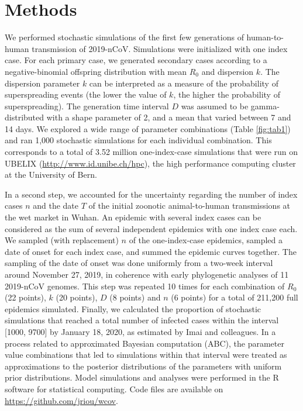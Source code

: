 \documentclass{article}
\begin{document}
\section{Methods}
We performed stochastic simulations of the first few generations of human-to-human transmission of 2019-nCoV. 
Simulations were initialized with one index case.
For each primary case, we generated secondary cases according to a negative-binomial offspring distribution with mean $R_0$ and dispersion $k$.\citep{Lloyd-Smith:2005,Althaus:2015b}
The dispersion parameter $k$ can be interpreted as a measure of the probability of superspreading events (the lower the value of $k$, the higher the probability of superspreading).
The generation time interval $D$ was assumed to be gamma-distributed with a shape parameter of 2, and a mean that varied between 7 and 14 days.
We explored a wide range of parameter combinations (Table \ref{fig:tab1}) and ran 1,000 stochastic simulations for each individual combination. 
This corresponds to a total of 3.52 million one-index-case simulations that were run on UBELIX (\url{http://www.id.unibe.ch/hpc}), the high performance computing cluster at the University of Bern. 

In a second step, we accounted for the uncertainty regarding the number of index cases $n$ and the date $T$ of the initial zoonotic animal-to-human transmissions at the wet market in Wuhan. 
An epidemic with several index cases can be considered as the sum of several independent epidemics with one index case each.
We sampled (with replacement) $n$ of the one-index-case epidemics, sampled a date of onset for each index case, and summed the epidemic curves together.
The sampling of the date of onset was done uniformly from a two-week interval around November 27, 2019, in coherence with early phylogenetic analyses of 11 2019-nCoV genomes.\cite{Rambaut:2020}
This step was repeated 10 times for each combination of $R_0$ (22 points), $k$ (20 points), $D$ (8 points) and $n$ (6 points) for a total of 211,200 full epidemics simulated.
Finally, we calculated the proportion of stochastic simulations that reached a total number of infected cases within the interval [1000, 9700] by January 18, 2020, as estimated by Imai and colleagues.\citep{Imai:2020}
In a process related to approximated Bayesian computation (ABC), the parameter value combinations that led to simulations within that interval were treated as approximations to the posterior distributions of the parameters with uniform prior distributions.
Model simulations and analyses were performed in the R software for statistical computing.\citep{R:2018} 
Code files are available on \url{https://github.com/jriou/wcov}.
\end{document}
